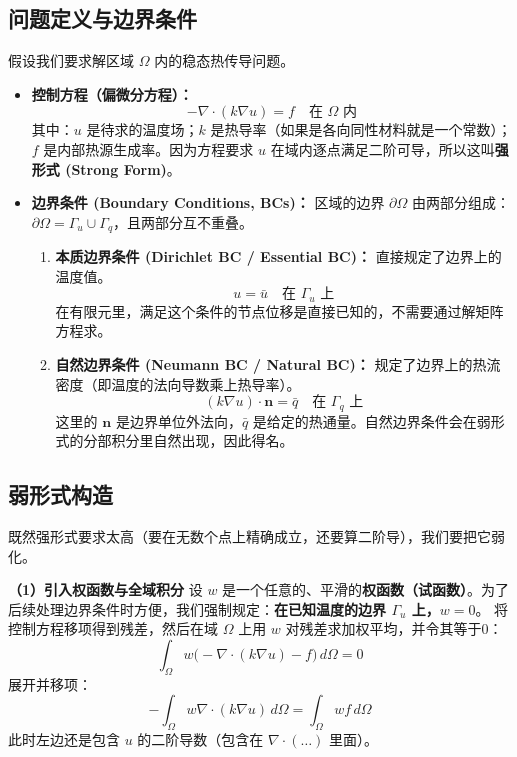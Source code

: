 \documentclass[11pt, a4paper, UTF8]{ctexart}
\begin{document}
\subsection{问题定义与边界条件}
假设我们要求解区域 $\Omega$ 内的稳态热传导问题。
\begin{itemize}
    \item \textbf{控制方程（偏微分方程）：}
    \[ -\nabla \cdot (k \nabla u) = f \quad \text{在 } \Omega \text{ 内} \]
    其中：$u$ 是待求的温度场；$k$ 是热导率（如果是各向同性材料就是一个常数）；$f$ 是内部热源生成率。因为方程要求 $u$ 在域内逐点满足二阶可导，所以这叫\textbf{强形式 (Strong Form)}。
    
    \item \textbf{边界条件 (Boundary Conditions, BCs)：}
    区域的边界 $\partial\Omega$ 由两部分组成：$\partial\Omega = \Gamma_u \cup \Gamma_q$，且两部分互不重叠。
    \begin{enumerate}
        \item \textbf{本质边界条件 (Dirichlet BC / Essential BC)：} 
        直接规定了边界上的温度值。
        \[ u = \bar{u} \quad \text{在 } \Gamma_u \text{ 上} \]
        在有限元里，满足这个条件的节点位移是直接已知的，不需要通过解矩阵方程求。
        
        \item \textbf{自然边界条件 (Neumann BC / Natural BC)：}
        规定了边界上的热流密度（即温度的法向导数乘上热导率）。
        \[ (k \nabla u) \cdot \bm{n} = \bar{q} \quad \text{在 } \Gamma_q \text{ 上} \]
        这里的 $\bm{n}$ 是边界单位外法向，$\bar{q}$ 是给定的热通量。自然边界条件会在弱形式的分部积分里自然出现，因此得名。
    \end{enumerate}
\end{itemize}

\subsection{弱形式构造}
既然强形式要求太高（要在无数个点上精确成立，还要算二阶导），我们要把它弱化。

\textbf{（1）引入权函数与全域积分}
设 $w$ 是一个任意的、平滑的\textbf{权函数（试函数）}。为了后续处理边界条件时方便，我们强制规定：\textbf{在已知温度的边界 $\Gamma_u$ 上，$w = 0$}。
将控制方程移项得到残差，然后在域 $\Omega$ 上用 $w$ 对残差求加权平均，并令其等于0：
\[ \int_{\Omega} w \Big( -\nabla \cdot (k \nabla u) - f \Big) \, d\Omega = 0 \]
展开并移项：
\[ -\int_{\Omega} w \nabla \cdot (k \nabla u) \, d\Omega = \int_{\Omega} w f \, d\Omega \]
此时左边还是包含 $u$ 的二阶导数（包含在 $\nabla \cdot (\dots)$ 里面）。
\end{document}
